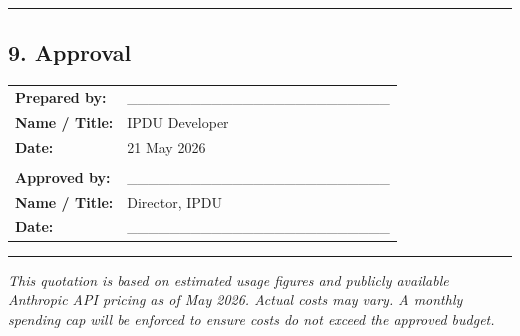 \documentclass[
]{article}
\newcounter{none} %
\begin{document}
\begin{center}\rule{0.5\linewidth}{0.5pt}\end{center}

\subsection{9. Approval}\label{approval}

{\def\LTcaptype{none} %
\begin{longtable}[]{@{}ll@{}}
\toprule\noalign{}
\endhead
\bottomrule\noalign{}
\endlastfoot
\textbf{Prepared by:} &
\_\_\_\_\_\_\_\_\_\_\_\_\_\_\_\_\_\_\_\_\_\_\_\_\_ \\
\textbf{Name / Title:} & IPDU Developer \\
\textbf{Date:} & 21 May 2026 \\
& \\
\textbf{Approved by:} &
\_\_\_\_\_\_\_\_\_\_\_\_\_\_\_\_\_\_\_\_\_\_\_\_\_ \\
\textbf{Name / Title:} & Director, IPDU \\
\textbf{Date:} & \_\_\_\_\_\_\_\_\_\_\_\_\_\_\_\_\_\_\_\_\_\_\_\_\_ \\
\end{longtable}
}

\begin{center}\rule{0.5\linewidth}{0.5pt}\end{center}

\emph{This quotation is based on estimated usage figures and publicly
available Anthropic API pricing as of May 2026. Actual costs may vary. A
monthly spending cap will be enforced to ensure costs do not exceed the
approved budget.}
\end{document}
